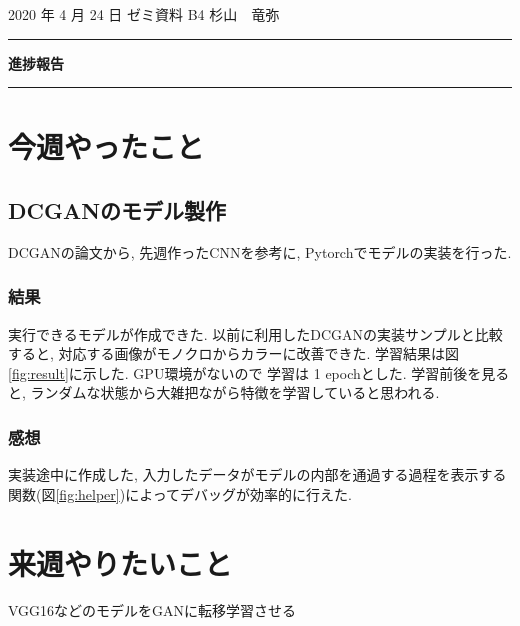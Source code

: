 \documentclass[onecolumn]{ujarticle}   %
\begin{document}
	\noindent

	\hspace{1em}
	2020 年 4 月 24 日
	ゼミ資料
	\hfill
	B4 杉山　竜弥

	\vspace{2mm}

	\hrule

	\begin{center}
		{\Large \bf 進捗報告}
	\end{center}


	\hrule
	\vspace{3mm}

	\section{今週やったこと}
	\subsection{DCGANのモデル製作}
	DCGAN\cite{radford2015unsupervised}の論文から,	先週作ったCNNを参考に, Pytorchでモデルの実装を行った.

	\subsubsection{結果}
	実行できるモデルが作成できた.
	以前に利用したDCGANの実装サンプルと比較すると, 対応する画像がモノクロからカラーに改善できた.
	学習結果は図\ref{fig:result}に示した. GPU環境がないので 学習は 1 epochとした. 学習前後を見ると, ランダムな状態から大雑把ながら特徴を学習していると思われる.

	\subsubsection{感想}
	実装途中に作成した, 入力したデータがモデルの内部を通過する過程を表示する関数(図\ref{fig:helper})によってデバッグが効率的に行えた.

	\section{来週やりたいこと}
	\begin{itemize}{
		\item{VGG16などのモデルをGANに転移学習させる}
	}\end{itemize}
\end{document}

